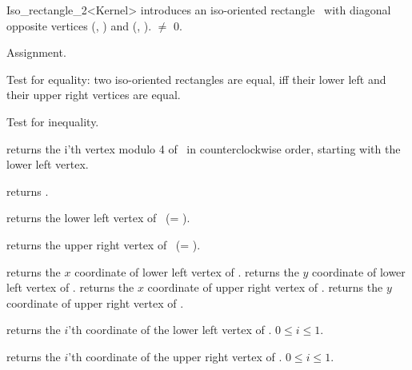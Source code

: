 \begin{ccRefClass} {Iso_rectangle_2<Kernel>}
            {introduces an iso-oriented rectangle \ccVar\ with diagonal
             opposite vertices (, ) and 
             (, ).  
             \ccPrecond {} $\neq$ 0.}

\ccOperations
\ccHidden {}
        {Assignment.}

       {Test for equality: two iso-oriented rectangles are equal, iff their
        lower left and their upper right vertices are equal.}

       {Test for inequality.}

       {returns the i'th vertex modulo 4  of \ccVar\ in counterclockwise order, 
        starting with the lower left vertex.}

       {returns  .}

       {returns the lower left vertex of \ccVar\ (= ).}


       {returns the upper right vertex of \ccVar\ (= ).}

       {returns the $x$ coordinate of lower left vertex of \ccVar.}
\ccGlue
{}
       {returns the $y$ coordinate of lower left vertex of \ccVar.}
\ccGlue
{}
       {returns the $x$ coordinate of upper right vertex of \ccVar.}
\ccGlue
{}
       {returns the $y$ coordinate of upper right vertex of \ccVar.}

       {returns the $i$'th  coordinate of the
        lower left vertex of \ccVar. 
        \ccPrecond $0 \leq i \leq 1$.}

       {returns the $i$'th  coordinate of the
        upper right vertex of \ccVar. 
        \ccPrecond $0 \leq i \leq 1$.}


\end{ccRefClass}
